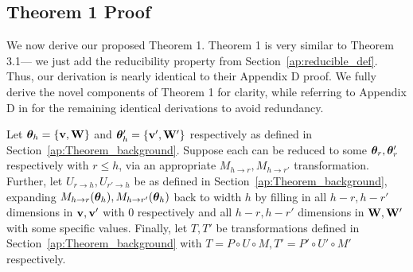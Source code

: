 \subsection{Theorem 1 Proof}\label{ap:Theorem_proof}
We now derive our proposed Theorem 1. Theorem 1 is very similar to Theorem 3.1--- we just add the reducibility property from Section~\ref{ap:reducible_def}.
Thus, our derivation is nearly identical to their Appendix D proof.
We fully derive the novel components of Theorem 1 for clarity, while referring to Appendix D in \cite{entezari2021role} for the remaining identical derivations to avoid redundancy.

Let $\bm{\theta}_h=\{{\mathbf{v}},{\mathbf{W}}\}$ and $\bm{\theta}_h'=\{{\mathbf{v'}},{\mathbf{W'}}\}$ respectively as defined in Section~\ref{ap:Theorem_background}. Suppose each can be reduced to some $\bm{\theta}_r,\bm{\theta}_r'$ respectively with $r\leq h$, via an appropriate $M_{h\rightarrow r}, M_{h\rightarrow r'}$ transformation. Further, let $U_{r\rightarrow h}, U_{r'\rightarrow h}$ be as defined in Section~\ref{ap:Theorem_background}, expanding $M_{h\rightarrow r}(\bm{\theta}_h), M_{h\rightarrow r'}(\bm{\theta}_h)$ back to width $h$ by filling in all $h-r, h-r'$ dimensions in ${\mathbf{v}},{\mathbf{v'}}$ with $0$ respectively and all $h-r, h-r'$ dimensions in ${\mathbf{W}},{\mathbf{W'}}$ with some specific values. 
Finally, let $T,T'$ be transformations defined in Section~\ref{ap:Theorem_background} with $T=P\circ U\circ M, T'=P'\circ U'\circ M'$ respectively. 

